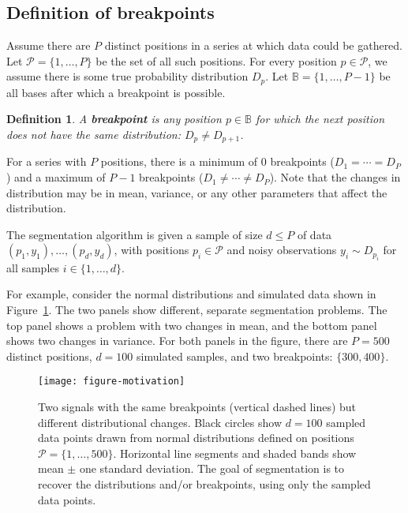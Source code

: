 \documentclass{jsfds} %
\newtheorem{definition}{Definition}
\begin{document}
\subsection{Definition of breakpoints}

Assume there are $P$ distinct positions in a series at
which data could be gathered. Let $\mathcal P= \{1,\dots,P\}$ be the
set of all such positions. For every position $p\in\mathcal P$, we
assume there is some true probability distribution $D_p$. Let $\mathbb
B=\{1,\dots,P-1\}$ be all bases after which a breakpoint is possible.

\begin{definition}
  A \textbf{breakpoint} is any position $p\in\mathbb B$ for which the
  next position does not have the same distribution: $D_p \neq
  D_{p+1}$. 
\end{definition}

For a series with $P$ positions, there is a minimum of 0 breakpoints
($D_1=\cdots=D_P$) and a maximum of $P-1$ breakpoints ($D_1 \neq
\cdots \neq D_P$). Note that the changes in distribution may be in
mean, variance, or any other parameters that affect the distribution.

The segmentation algorithm is given a sample of size $d \leq P$ of
data $(p_1, y_1), \dots, (p_d, y_d)$, with positions $p_i\in\mathcal
P$ and noisy observations $y_i\sim D_{p_i}$ for all samples $i\in\{1,
\dots, d\}$.

\newpage

For example, consider the normal distributions and simulated data
shown in Figure~\ref{fig:motivation}. The two panels show different,
separate segmentation problems. The top panel shows a problem with two
changes in mean, and the bottom panel shows two changes in
variance. For both panels in the figure, there are $P=500$ distinct
positions, $d=100$ simulated samples, and two breakpoints:
$\{300, 400\}$.

\begin{figure}[h!]
  \centering
  \texttt{[image: figure-motivation]}
  \vskip -0.5cm
  \caption{Two signals with the same breakpoints (vertical dashed
    lines) but different distributional changes. Black circles show
    $d=100$ sampled data points drawn from normal distributions
    defined on positions $\mathcal P=\{1, \dots, 500\}$. Horizontal line
    segments and shaded bands show mean $\pm$ one standard
    deviation. The goal of segmentation is to recover the
    distributions and/or breakpoints, using only the sampled data
    points.}
  \label{fig:motivation}
\end{figure}
\end{document}
